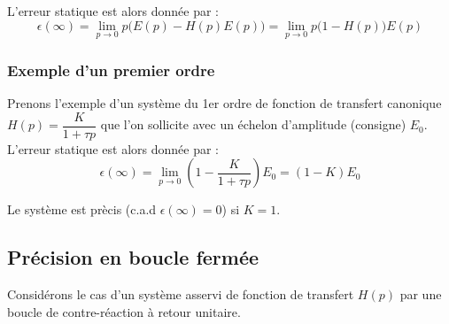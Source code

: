 L'erreur statique est alors donnée par :
$$
\epsilon(\infty)=\lim\limits_{p\to 0} p\big(E(p)-H(p)E(p)\big)
                =\lim\limits_{p\to 0} p\big(1-H(p)\big)E(p)
$$
\subsubsection{Exemple d'un premier ordre}
Prenons l'exemple d'un système du 1er ordre de fonction de transfert canonique 
$H(p)=\dfrac{K}{1+\tau p}$ que l'on sollicite avec un échelon 
d'amplitude (consigne) $E_0$.
L'erreur statique est alors donnée par :
$$
\epsilon(\infty)=\lim\limits_{p\to 0}\left(1-\dfrac{K}{1+\tau p}\right)E_0
                =(1-K)E_0
$$

Le système est prècis (c.a.d $\epsilon(\infty)=0$) si $K=1$. 




\subsection{Précision en boucle fermée}

Considérons le cas d'un système asservi de fonction de transfert $H(p)$
par une boucle de contre-réaction à retour unitaire.

